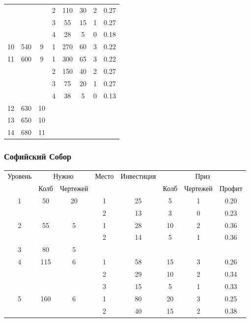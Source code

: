 \begin{longtable}[c]{|c|c|c|c|c|c|c|c|}
    & & & 2 & 110 & 30 & 2 & 0.27 \\\cline{4-8}
    & & & 3 & 55 & 15 & 1 & 0.27 \\\cline{4-8}
    & & & 4 & 28 & 5 & 0 & 0.18 \\\hline
    \multirow{1}{*}{10} & \multirow{1}{*}{540} & \multirow{1}{*}{9} & 1 & 270 & 60 & 3 & 0.22 \\\hline
    \multirow{4}{*}{11} & \multirow{4}{*}{600} & \multirow{4}{*}{9} & 1 & 300 & 65 & 3 & 0.22 \\\cline{4-8}
    & & & 2 & 150 & 40 & 2 & 0.27 \\\cline{4-8}
    & & & 3 & 75 & 20 & 1 & 0.27 \\\cline{4-8}
    & & & 4 & 38 & 5 & 0 & 0.13 \\\hline
    \multirow{1}{*}{12} & \multirow{1}{*}{630} & \multirow{1}{*}{10} & & & & & \\\hline
    \multirow{1}{*}{13} & \multirow{1}{*}{650} & \multirow{1}{*}{10} & & & & & \\\hline
    \multirow{1}{*}{14} & \multirow{1}{*}{680} & \multirow{1}{*}{11} & & & & & \\\hline
\end{longtable}


\subsubsection{Софийский Собор}

\begin{longtable}[c]{|c|c|c|c|c|c|c|c|}
    \hline
    \multirow{ 2}{*}{\small Уровень} &
    \multicolumn{2}{|c|}{\small Нужно} &
    \multirow{ 2}{*}{\small Место} & 
    \multirow{ 2}{*}{\small Инвестиция} & 
    \multicolumn{3}{|c|}{\small Приз} \\\cline{2-3}\cline{6-8}
    &
    {\small Колб} & 
    {\small Чертежей} & 
    & &
    {\small Колб} & 
    {\small Чертежей} & 
    {\small Профит}
    \\\hline\endhead
    \multirow{2}{*}{1} & \multirow{2}{*}{50} & \multirow{2}{*}{20} & 1 & 25 & 5 & 1 & 0.20 \\\cline{4-8}
    & & & 2 & 13 & 3 & 0 & 0.23 \\\hline
    \multirow{2}{*}{2} & \multirow{2}{*}{55} & \multirow{2}{*}{5} & 1 & 28 & 10 & 2 & 0.36 \\\cline{4-8}
    & & & 2 & 14 & 5 & 1 & 0.36 \\\hline
    \multirow{1}{*}{3} & \multirow{1}{*}{80} & \multirow{1}{*}{5} & & & & & \\\hline
    \multirow{3}{*}{4} & \multirow{3}{*}{115} & \multirow{3}{*}{6} & 1 & 58 & 15 & 3 & 0.26 \\\cline{4-8}
    & & & 2 & 29 & 10 & 2 & 0.34 \\\cline{4-8}
    & & & 3 & 15 & 5 & 1 & 0.33 \\\hline
    \multirow{2}{*}{5} & \multirow{2}{*}{160} & \multirow{2}{*}{6} & 1 & 80 & 20 & 3 & 0.25 \\\cline{4-8}
    & & & 2 & 40 & 15 & 2 & 0.38 \\\hline
\end{longtable}


